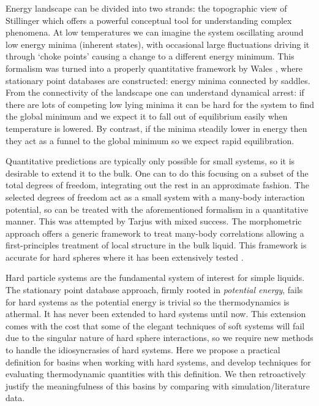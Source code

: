 \documentclass[11pt,twoside]{report}
\begin{document}
Energy landscape can be divided into two strands: the topographic view of Stillinger which offers a powerful conceptual tool for understanding complex phenomena.
At low temperatures we can imagine the system oscillating around low energy minima (inherent states), with occasional large fluctuations driving it through `choke points' causing a change to a different energy minimum.
This formalism was turned into a properly quantitative framework by Wales \cite{Wales2004,?}, where stationary point databases are constructed: energy minima connected by saddles.
From the connectivity of the landscape one can understand dynamical arrest: if there are lots of competing low lying minima it can be hard for the system to find the global minimum and we expect it to fall out of equilibrium easily when temperature is lowered.
By contrast, if the minima steadily lower in energy then they act as a funnel to the global minimum so we expect rapid equilibration.

Quantitative predictions are typically only possible for small systems, so it is desirable to extend it to the bulk.
One can to do this focusing on a subset of the total degrees of freedom, integrating out the rest in an approximate fashion.
The selected degrees of freedom act as a small system with a many-body interaction potential, so can be treated with the aforementioned formalism in a quantitative manner.
This was attempted by Tarjus \cite{?} with mixed success.
The morphometric approach \cite{KonigPRL2004,RothPRL2006,RobinsonPRL2019} offers a generic framework to treat many-body correlations allowing a first-principles treatment of local structure in the bulk liquid.
This framework is accurate for hard spheres where it has been extensively tested \cite{Hansen-Goos?,Roth?,Bob?,RobinsonPRL2019}.

Hard particle systems are the fundamental system of interest for simple liquids.
The stationary point database approach, firmly rooted in \emph{potential energy}, fails for hard systems as the potential energy is trivial so the thermodynamics is athermal.
It has never been extended to hard systems until now.
This extension comes with the cost that some of the elegant techniques of soft systems will fail due to the singular nature of hard sphere interactions, so we require new methods to handle the idiosyncrasies of hard systems.
Here we propose a practical definition for basins when working with hard systems, and develop techniques for evaluating thermodynamic quantities with this definition.
We then retroactively justify the meaningfulness of this basins by comparing with simulation/literature data.
\end{document}
